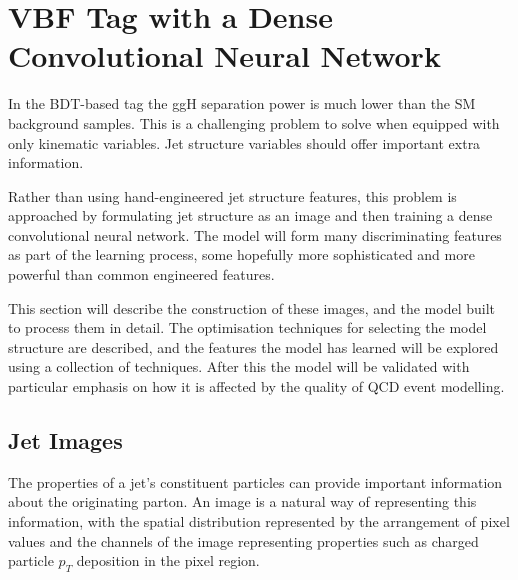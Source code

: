 \section[DCNN VBF Tag]{VBF Tag with a Dense Convolutional Neural Network}
In the BDT-based tag the ggH separation power is much lower than the SM background samples. 
This is a challenging problem to solve when equipped with only kinematic variables. Jet structure variables should offer important extra information.

Rather than using hand-engineered jet structure features, this problem is approached by formulating jet structure as an image and then training a dense convolutional neural network.
The model will form many discriminating features as part of the learning process, some hopefully more sophisticated  and more powerful than common engineered features. 

This section will describe the construction of these images, and the model built to process them in detail. The optimisation techniques for selecting the model structure are described, and the features the model has learned will be explored using a collection of techniques. After this the model will be validated with particular emphasis on how it is affected by the quality of QCD event modelling. 





\subsection{Jet Images}
The properties of a jet's constituent particles can provide important information about the originating parton. 
An image is a natural way of representing this information, with the spatial distribution represented by the arrangement of pixel values and the channels of the image representing properties such as charged particle $p_{T}$ deposition in the pixel region. 

